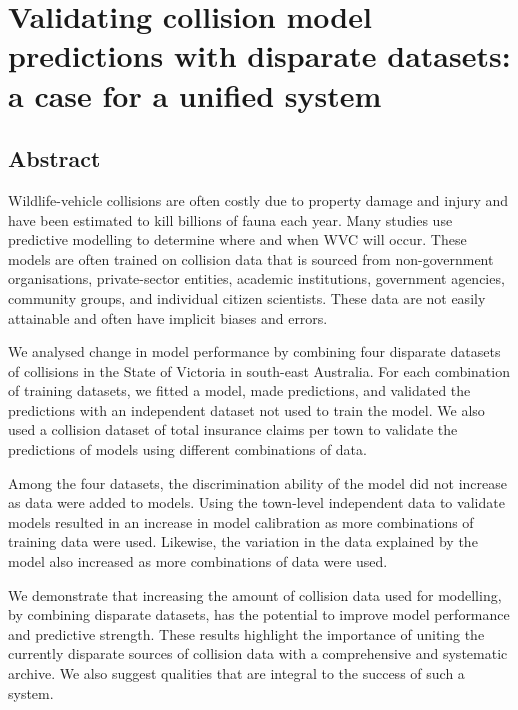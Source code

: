 \chapter{Validating collision model predictions with disparate datasets: a case for a unified system}\label{sec:val}
\newpage

\begin{localsize}{11}
\section*{\centering Abstract}

Wildlife-vehicle collisions are often costly due to property damage and injury and have been estimated to kill billions of fauna each year. Many studies use predictive modelling to determine where and when WVC will occur. These models are often trained on collision data that is sourced from non-government organisations, private-sector entities, academic institutions, government agencies, community groups, and individual citizen scientists. These data are not easily attainable and often have implicit biases and errors.

We analysed change in model performance by combining four disparate datasets of collisions in the State of Victoria in south-east Australia. For each combination of training datasets, we fitted a model, made predictions, and validated the predictions with an independent dataset not used to train the model. We also used a collision dataset of total insurance claims per town to validate the predictions of models using different combinations of data. 

Among the four datasets, the discrimination ability of the model did not increase as data were added to models. Using the town-level independent data to validate models resulted in an increase in model calibration as more combinations of training data were used. Likewise, the variation in the data explained by the model also increased as more combinations of data were used.

We demonstrate that increasing the amount of collision data used for modelling, by combining disparate datasets, has the potential to improve model performance and predictive strength. These results highlight the importance of uniting the currently disparate sources of collision data with a comprehensive and systematic archive. We also suggest qualities that are integral to the success of such a system.
\end{localsize}

